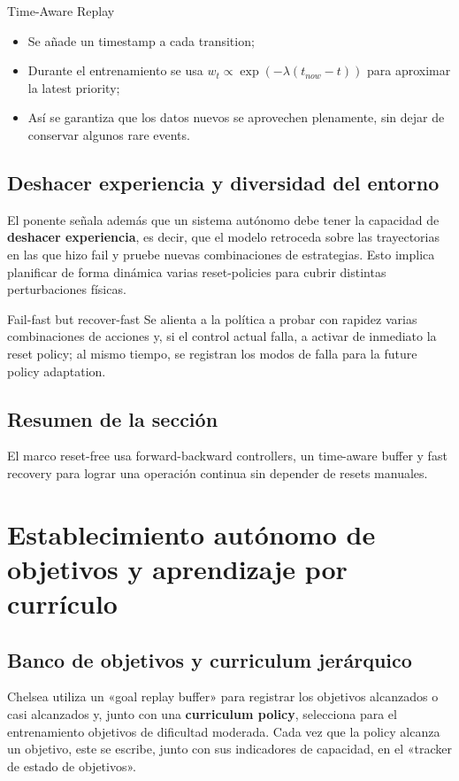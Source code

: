 \documentclass[a4paper]{article}
\begin{document}
\begin{knowledgebox}{Time-Aware Replay}
\begin{itemize}
\item Se añade un timestamp a cada transition;\\
\item Durante el entrenamiento se usa $w_t \propto \exp(-\lambda (t_{now}-t))$ para aproximar la latest priority;\\
\item Así se garantiza que los datos nuevos se aprovechen plenamente, sin dejar de conservar algunos rare events.
\end{itemize}
\end{knowledgebox}

\subsection{Deshacer experiencia y diversidad del entorno}
El ponente señala además que un sistema autónomo debe tener la capacidad de \textbf{deshacer experiencia}, es decir, que el modelo retroceda sobre las trayectorias en las que hizo fail y pruebe nuevas combinaciones de estrategias. Esto implica planificar de forma dinámica varias reset-policies para cubrir distintas perturbaciones físicas.
\begin{warningbox}{Fail-fast but recover-fast}
Se alienta a la política a probar con rapidez varias combinaciones de acciones y, si el control actual falla, a activar de inmediato la reset policy; al mismo tiempo, se registran los modos de falla para la future policy adaptation.
\end{warningbox}

\subsection{Resumen de la sección}
El marco reset-free usa forward-backward controllers, un time-aware buffer y fast recovery para lograr una operación continua sin depender de resets manuales.
\newpage
\section{Establecimiento autónomo de objetivos y aprendizaje por currículo}
\subsection{Banco de objetivos y curriculum jerárquico}
Chelsea utiliza un «goal replay buffer» para registrar los objetivos alcanzados o casi alcanzados y, junto con una \textbf{curriculum policy}, selecciona para el entrenamiento objetivos de dificultad moderada. Cada vez que la policy alcanza un objetivo, este se escribe, junto con sus indicadores de capacidad, en el «tracker de estado de objetivos».
\end{document}
